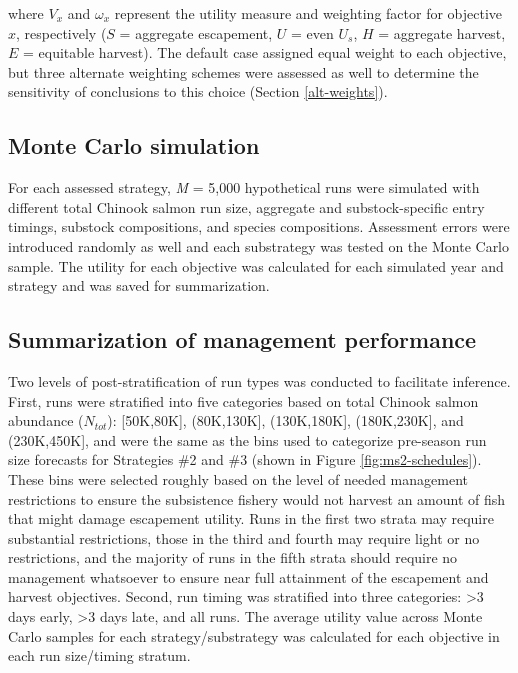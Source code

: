 \documentclass[12pt,]{book}
\theoremstyle{definition}
\theoremstyle{definition}
\theoremstyle{definition}
\theoremstyle{remark}
\begin{document}
\noindent
where \(V_x\) and \(\omega_x\) represent the utility measure and
weighting factor for objective \(x\), respectively (\(S\) = aggregate
escapement, \(U\) = even \(U_s\), \(H\) = aggregate harvest, \(E\) =
equitable harvest). The default case assigned equal weight to each
objective, but three alternate weighting schemes were assessed as well
to determine the sensitivity of conclusions to this choice (Section
\ref{alt-weights}).

\subsection{Monte Carlo simulation}\label{monte-carlo-simulation}

\noindent
For each assessed strategy, \emph{M} = 5,000 hypothetical runs were
simulated with different total Chinook salmon run size, aggregate and
substock-specific entry timings, substock compositions, and species
compositions. Assessment errors were introduced randomly as well and
each substrategy was tested on the Monte Carlo sample. The utility for
each objective was calculated for each simulated year and strategy and
was saved for summarization.

\subsection{Summarization of management
performance}\label{summarization-of-management-performance}

\noindent
Two levels of post-stratification of run types was conducted to
facilitate inference. First, runs were stratified into five categories
based on total Chinook salmon abundance (\(N_{tot}\)): {[}50K,80K{]},
(80K,130K{]}, (130K,180K{]}, (180K,230K{]}, and (230K,450K{]}, and were
the same as the bins used to categorize pre-season run size forecasts
for Strategies \#2 and \#3 (shown in Figure \ref{fig:ms2-schedules}).
These bins were selected roughly based on the level of needed management
restrictions to ensure the subsistence fishery would not harvest an
amount of fish that might damage escapement utility. Runs in the first
two strata may require substantial restrictions, those in the third and
fourth may require light or no restrictions, and the majority of runs in
the fifth strata should require no management whatsoever to ensure near
full attainment of the escapement and harvest objectives. Second, run
timing was stratified into three categories: \textgreater{}3 days early,
\textgreater{}3 days late, and all runs. The average utility value
across Monte Carlo samples for each strategy/substrategy was calculated
for each objective in each run size/timing stratum.
\end{document}
